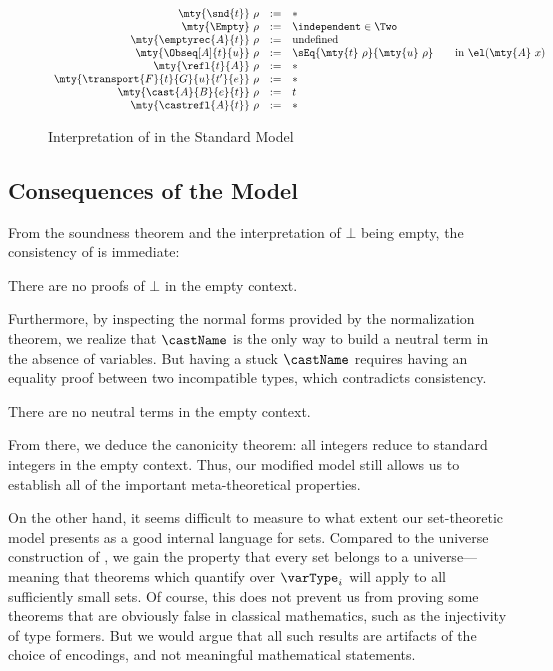\begin{figure}
\begin{small}
\[\begin{array}{rcl}
  \mty{\snd{t}}\ \rho & := & * \\
  \mty{\Empty}\ \rho & := & \independent \in \Two \\
  \mty{\emptyrec{A}{t}}\ \rho & := & \text{undefined} \\
  \mty{\Obseq[A]{t}{u}}\ \rho & := & \sEq{\mty{t}\ \rho}{\mty{u}\ \rho} \qquad\text{in }\el(\mty{A}\ x) \\
  \mty{\refl{t}{A}}\ \rho & := & * \\
  \mty{\transport{F}{t}{G}{u}{t'}{e}}\ \rho & := & * \\
  \mty{\cast{A}{B}{e}{t}}\ \rho & := & t\\
  \mty{\castrefl{A}{t}}\ \rho & := & *
\end{array}
\]
\end{small}
  \caption{Interpretation of \SetoidCC in the Standard Model}
  \label{fig:interpretation}
\end{figure}

\subsection{Consequences of the Model}

From the soundness theorem and the interpretation of \( \bot \) being empty,
the consistency of \SetoidCC is immediate:

\begin{theorem}[Consistency]
  There are no proofs of \( \bot \) in the empty context.
\end{theorem}

Furthermore, by inspecting the normal forms provided by the normalization
theorem, we realize that \( \castName \) is the only way to build a neutral
term in the absence of variables. But having a stuck \( \castName \) requires
having an equality proof between two incompatible types, which contradicts
consistency.

\begin{theorem}
  There are no neutral terms in the empty context.
\end{theorem}

From there, we deduce the canonicity theorem: all integers reduce to
standard integers in the empty context. Thus, our modified model still allows
us to establish all of the important meta-theoretical properties.

On the other hand, it seems difficult to measure to what extent our
set-theoretic model presents
\SetoidCC as a good internal language for sets. Compared to the universe
construction of , we gain the property that every set belongs
to a universe---meaning that theorems which quantify over \( \varType_i \)
will apply to all sufficiently small sets.
%
Of course, this does not prevent us from proving some theorems that are
obviously false in classical mathematics, such as the
injectivity of type formers. But we would argue that all such results
are artifacts of the choice of encodings, and not meaningful
mathematical statements.

